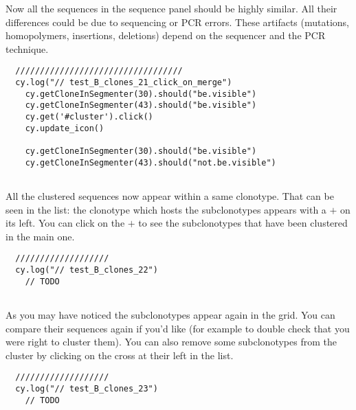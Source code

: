 Now all the sequences in the sequence panel should be highly similar. All their
differences could be due to sequencing or PCR errors.
These artifacts (mutations, homopolymers, insertions, deletions)
depend on the sequencer and the PCR technique.

\begin{verbatim}
  //////////////////////////////////
  cy.log("// test_B_clones_21_click_on_merge")
    cy.getCloneInSegmenter(30).should("be.visible")
    cy.getCloneInSegmenter(43).should("be.visible")
    cy.get('#cluster').click()
    cy.update_icon()

    cy.getCloneInSegmenter(30).should("be.visible")
    cy.getCloneInSegmenter(43).should("not.be.visible")


\end{verbatim}

All the clustered sequences now appear within a same clonotype. That can be seen
in the list: the clonotype which hosts the subclonotypes appears with a $+$ on its
left. You can click on the $+$ to see the subclonotypes that have been clustered in
the main one.
\begin{verbatim}
  ///////////////////
  cy.log("// test_B_clones_22")
    // TODO


\end{verbatim}

As you may have noticed the subclonotypes appear again in the grid. You can
compare their sequences again if you'd like (for example to double check that
you were right to cluster them). You can also remove some subclonotypes from the
cluster by clicking on the cross at their left in the list.
\begin{verbatim}
  ///////////////////
  cy.log("// test_B_clones_23")
    // TODO


\end{verbatim}

